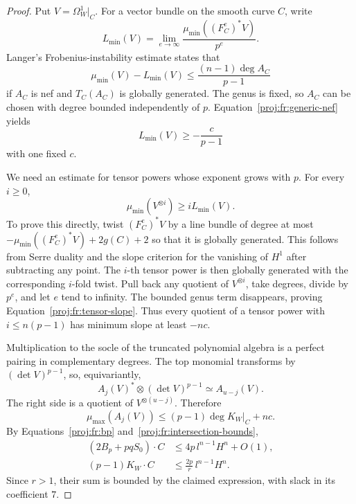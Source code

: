 \begin{proof}
Put \(V=\Omega_W^1|_C\). For a vector bundle on the smooth curve \(C\),
write
\[
 L_{\min}(V)=
 \lim_{e\to\infty}
 \frac{\mu_{\min}((F_C^e)^*V)}{p^e}.
\]
Langer's Frobenius-instability estimate
\cite[Corollary~2.5]{Proj-Langer2004} states that
\[
 \mu_{\min}(V)-L_{\min}(V)
       \leq \frac{(n-1)\deg A_C}{p-1}
\]
if \(A_C\) is nef and \(T_C(A_C)\) is globally generated.
The genus is fixed, so \(A_C\) can be chosen with degree bounded
independently of \(p\). Equation~\eqref{proj:fr:generic-nef} yields
\begin{equation}
\label{proj:fr:asymptotic-slope}
 L_{\min}(V)\geq-\frac{c}{p-1}
\end{equation}
with one fixed \(c\).

We need an estimate for tensor powers whose exponent grows with \(p\).
For every \(i\geq0\),
\begin{equation}
\label{proj:fr:tensor-slope}
 \mu_{\min}(V^{\otimes i})\geq iL_{\min}(V).
\end{equation}
To prove this directly, twist \((F_C^e)^*V\) by a line bundle of
degree at most
\(-\mu_{\min}((F_C^e)^*V)+2g(C)+2\) so that it is globally generated.
This follows from Serre duality and the slope criterion for the
vanishing of \(H^1\) after subtracting any point. The \(i\)-th tensor
power is then globally generated with the corresponding \(i\)-fold
twist. Pull back any quotient of \(V^{\otimes i}\), take degrees,
divide by \(p^e\), and let \(e\) tend to infinity. The bounded genus
term disappears, proving Equation~\eqref{proj:fr:tensor-slope}.
Thus every quotient of a tensor power with \(i\leq n(p-1)\) has
minimum slope at least \(-nc\).

Multiplication to the socle of the truncated polynomial algebra is
a perfect pairing in complementary degrees. The top monomial
transforms by \((\det V)^{p-1}\), so, equivariantly,
\[
 A_j(V)^*\otimes(\det V)^{p-1}\simeq A_{u-j}(V).
\]
The right side is a quotient of \(V^{\otimes(u-j)}\). Therefore
\[
 \mu_{\max}(A_j(V))\leq(p-1)\deg K_W|_C+nc.
\]
By Equations~\eqref{proj:fr:bp} and~\eqref{proj:fr:intersection-bounds},
\begin{align*}
 (2B_p+pqS_0)\cdot C
   &\leq4p\,l^{n-1}H^n+O(1),\\
 (p-1)K_W\cdot C
   &\leq\frac{2p}{r}\,l^{n-1}H^n.
\end{align*}
Since \(r>1\), their sum is bounded by the claimed expression,
with slack in its coefficient \(7\).
\end{proof}

